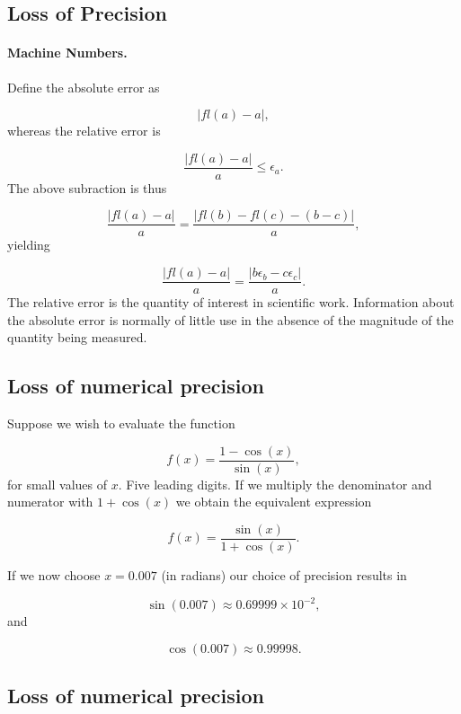 \documentclass[%
twoside,                 %
final,                   %
10pt]{article}
\newenvironment{paragraphadmon}[1][]{\paragraph{#1}}{}
\begin{document}
\subsection{Loss of Precision}


\begin{paragraphadmon}[Machine Numbers.]
Define
the absolute error as

\begin{equation}
   |fl(a)-a|,
\end{equation}
whereas the relative error is

\begin{equation}
   \frac{ |fl(a)-a|}{a} \le \epsilon_a.
\end{equation}
The above subraction is thus

\begin{equation}
   \frac{ |fl(a)-a|}{a}=\frac{ |fl(b)-fl(c)-(b-c)|}{a},
\end{equation}
yielding

\begin{equation}
   \frac{ |fl(a)-a|}{a}=\frac{ |b\epsilon_b- c\epsilon_c|}{a}.
\end{equation}
The relative error
is the quantity of interest in scientific work. Information about the
absolute error is normally of little use in the absence of the magnitude
of the quantity being measured.
\end{paragraphadmon}



\subsection{Loss of numerical precision}

Suppose we wish to evaluate the function

\[
   f(x)=\frac{1-\cos(x)}{\sin(x)},
\]
for small values of $x$. Five leading digits. If we multiply the denominator and numerator
with $1+\cos(x)$ we obtain the equivalent expression

\[
   f(x)=\frac{\sin(x)}{1+\cos(x)}.
\]

If we now choose $x=0.007$ (in radians) our choice of precision results in

\[
   \sin(0.007)\approx 0.69999\times 10^{-2},
\]
and

\[
   \cos(0.007)\approx 0.99998.
\]

\subsection{Loss of numerical precision}
\end{document}
